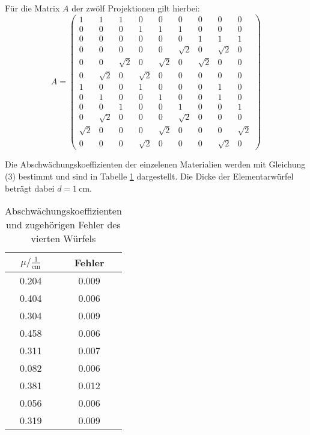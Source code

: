 Für die Matrix $A$ der zwölf Projektionen gilt hierbei:
$$ A =
\left( \begin{matrix}
       1       & 1 &       1 &       0 &        0 &       0 &       0 &       0 &        0      \\
       0       & 0 &       0 &       1 &        1 &       1 &       0 &       0 &        0      \\
       0       & 0 &       0 &       0 &        0 &       0 &       1 &       1 &        1      \\
       0       & 0 &       0 &       0 &        0 &       \sqrt{2}& 0 &       \sqrt{2}&  0      \\
       0       & 0 &       \sqrt{2}& 0 &        \sqrt{2}& 0 &      \sqrt{2}&  0 &       0      \\
       0       & \sqrt{2}& 0 &      \sqrt{2}&   0 &       0 &       0 &       0 &       0      \\
       1       & 0 &       0 &       1 &        0 &       0 &       0 &       1 &       0      \\
       0       & 1 &       0 &       0 &        1 &       0 &       0 &       1 &       0      \\
       0       & 0 &       1 &       0 &        0 &       1 &       0 &       0 &       1      \\
       0       & \sqrt{2}& 0 &       0 &        0 &       \sqrt{2}& 0 &       0 &       0      \\
       \sqrt{2}& 0 &       0 &       0 &        \sqrt{2}& 0 &       0 &       0 &       \sqrt{2}      \\
       0       & 0 &       0 &       \sqrt{2}&  0 &       0 &       0 &       \sqrt{2} & 0
\end{matrix} \right)
$$

Die Abschwächungskoeffizienten der einzelenen Materialien werden mit Gleichung (3) bestimmt und sind in Tabelle \ref{tab:blob} dargestellt.
Die Dicke der Elementarwürfel beträgt dabei $d=\SI{1}{\centi\meter}$.
\begin{table}[H]
  \centering
  \caption{Abschwächungskoeffizienten und zugehörigen Fehler des vierten Würfels}
  \label{tab:blob}
  \begin{tabular}{c c}
    \toprule
    $\mu/ \mathrm{\frac{1}{cm}}$ & Fehler   \\
    \midrule
    0.204      &  0.009 \\
    0.404      &  0.006 \\
    0.304      &  0.009 \\
    0.458      &  0.006 \\
    0.311      &  0.007 \\
    0.082      &  0.006 \\
    0.381      &  0.012 \\
    0.056      &  0.006 \\
    0.319      &  0.009 \\
    \bottomrule
  \end{tabular}
\end{table}


